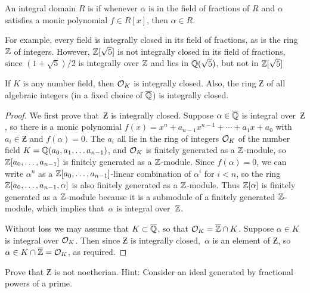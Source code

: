 \begin{definition}
An integral domain $R$ is  if whenever $\alpha$ is in the field of fractions of $R$
and $\alpha$ satisfies a monic polynomial $f\in R[x]$, then $\alpha
\in R$.
\end{definition}

For example, every field is integrally closed in its field of
fractions, as is the ring $\mathbb{Z}$ of integers.  However, $\mathbb{Z}[\sqrt{5}]$
is not integrally closed in its field of fractions, since
$(1+\sqrt{5})/2$ is integrally over $\mathbb{Z}$ and lies in $\mathbb{Q}(\sqrt{5})$,
but not in $\mathbb{Z}[\sqrt{5}]$

\begin{proposition}\label{prop:integrallyclosed}
If $K$ is any number field, then $\mathcal{O}_K$ is integrally closed.  Also,
the ring $\Zbar$ of all algebraic integers (in a fixed choice of $\overline{\mathbb{Q}}$)
is integrally closed.
\end{proposition}
\begin{proof}
We first prove that~$\Zbar$ is integrally closed.  Suppose $\alpha\in\overline{\mathbb{Q}}$
is integral over~$\Zbar$, so there is a monic polynomial $f(x)=x^n +
a_{n-1}x^{n-1} + \cdots + a_1 x + a_0$ with $a_i\in\Zbar$ and
$f(\alpha)=0$.  The $a_i$ all lie in the ring of integers $\mathcal{O}_K$ of the
number field $K=\mathbb{Q}(a_0,a_1,\ldots a_{n-1})$, and $\mathcal{O}_K$ is finitely
generated as a $\mathbb{Z}$-module, so $\mathbb{Z}[a_0,\ldots, a_{n-1}]$ is finitely
generated as a $\mathbb{Z}$-module.  Since $f(\alpha)=0$, we can write $\alpha^n$ as a
$\mathbb{Z}[a_0,\ldots, a_{n-1}]$-linear combination of $\alpha^i$ for $i<n$, so
the ring $\mathbb{Z}[a_0,\ldots, a_{n-1},\alpha]$ is also finitely generated as a
$\mathbb{Z}$-module.  Thus $\mathbb{Z}[\alpha]$ is finitely generated as a $\mathbb{Z}$-module
because it is a submodule of a finitely generated $\mathbb{Z}$-module, which
implies that~$\alpha$ is integral over~$\mathbb{Z}$.

Without loss we may assume that $K\subset \overline{\mathbb{Q}}$, so that
$\mathcal{O}_K = \overline{\mathbb{Z}} \cap K$.
Suppose $\alpha\in K$ is integral over $\mathcal{O}_K$.  Then since $\Zbar$ is
integrally closed,~$\alpha$ is an element of $\Zbar$, so
$\alpha\in K \cap \overline{\mathbb{Z}}=\mathcal{O}_K$, as required.
\end{proof}

\begin{exercise}\label{ex:Zbarnotnoetherian}
	Prove that $\Zbar$ is not noetherian. Hint: Consider an ideal
	generated by fractional powers of a prime.
\end{exercise}

